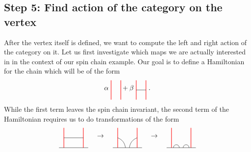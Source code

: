 \subsection*{Step 5: Find action of the category on the vertex} After the vertex itself is defined, we want to compute the left and right action of the category on it. Let us first investigate which maps we are actually interested in in the context of our spin chain example. Our goal is to define a Hamiltonian for the chain which will be of the form
	\begin{equation*}
		\alpha\ \begin{tikzpicture}[scale=1,baseline=(current bounding box.center)]
			\draw [red, line width=0.25mm] (0,0) -- (0,1);
			\draw [red, line width=0.25mm] (0.5,0) -- (0.5,1);
		\end{tikzpicture}
		+\beta\ \begin{tikzpicture}[scale=1,baseline=(current bounding box.center)]
			\draw [red, line width=0.25mm] (0,0) -- (0,1);
			\draw [red, line width=0.25mm] (0.5,0) -- (0.5,1);
			\draw (0,0.5) -- (0.5,0.5);
		\end{tikzpicture}\ .
	\end{equation*}
While the first term leaves the spin chain invariant, the second term of the Hamiltonian requires us to do transformations of the form
	\begin{equation*}
		\begin{tikzpicture}[scale=1,baseline=(current bounding box.center)]
			\draw (-0.25,0) -- (1.25,0);
			\draw [red, line width=0.25mm] (0,0) -- (0,1);
			\draw [red, line width=0.25mm] (1,0) -- (1,1);
			\draw (0,0.5) -- (1,0.5);
		\end{tikzpicture} \hspace{10pt}\rightarrow\hspace{10pt}
		\begin{tikzpicture}[scale=1,baseline=(current bounding box.center)]
			\draw (-0.25,0) -- (1.25,0);
			\draw [red, line width=0.25mm] (0,0) -- (0,1);
			\draw [red, line width=0.25mm] (1,0) -- (1,1);
			\draw (0,0.5) to [bend left] (0.4,0);
			\draw (1,0.5) to [bend right] (0.6,0);
		\end{tikzpicture} \hspace{10pt}\rightarrow\hspace{10pt}
		\begin{tikzpicture}[scale=1,baseline=(current bounding box.center)]
			\draw (-0.25,0) -- (1.25,0);
			\draw [red, line width=0.25mm] (0,0) -- (0,1);
			\draw [red, line width=0.25mm] (1,0) -- (1,1);
			\draw ([shift=(180:0.15cm)]0.55,0) arc (0:180:0.15cm);
			\draw ([shift=(180:0.15cm)]1.05,0) arc (0:180:0.15cm);
		\end{tikzpicture}
	\end{equation*}
